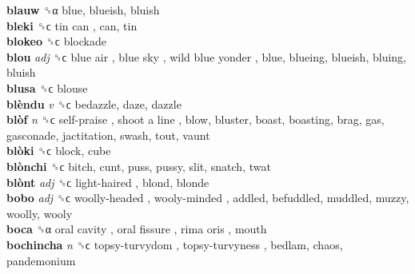 \textbf{blauw} ␝α  blue, blueish, bluish  \\
\textbf{bleki} ␝ϲ   tin can , can, tin  \\
\textbf{blokeo} ␝ϲ  blockade  \\
\textbf{blou} \emph{adj}  ␝ϲ   blue air ,  blue sky ,  wild blue yonder , blue, blueing, blueish, bluing, bluish  \\
\textbf{blusa} ␝ϲ  blouse  \\
\textbf{blèndu} \emph{v}  ␝ϲ  bedazzle, daze, dazzle  \\
\textbf{blòf} \emph{n}  ␝ϲ   self-praise ,  shoot a line , blow, bluster, boast, boasting, brag, gas, gasconade, jactitation, swash, tout, vaunt  \\
\textbf{blòki} ␝ϲ  block, cube  \\
\textbf{blònchi} ␝ϲ  bitch, cunt, puss, pussy, slit, snatch, twat  \\
\textbf{blònt} \emph{adj}  ␝ϲ   light-haired , blond, blonde  \\
\textbf{bobo} \emph{adj}  ␝ϲ   woolly-headed ,  wooly-minded , addled, befuddled, muddled, muzzy, woolly, wooly  \\
\textbf{boca} ␝α   oral cavity ,  oral fissure ,  rima oris , mouth  \\
\textbf{bochincha} \emph{n}  ␝ϲ   topsy-turvydom ,  topsy-turvyness , bedlam, chaos, pandemonium  \\
